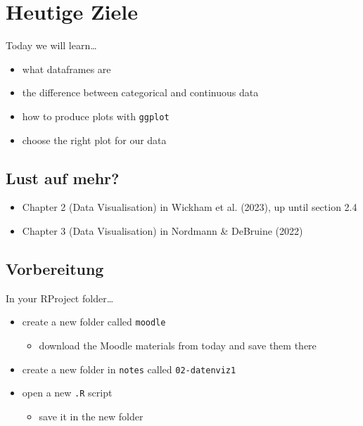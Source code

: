 \documentclass[
  letterpaper,
  DIV=11]{scrartcl}
\providecommand{\tightlist}{%
  \setlength{\itemsep}{0pt}\setlength{\parskip}{0pt}}\usepackage{longtable,booktabs,array}
\theoremstyle{definition}
\theoremstyle{remark}
\begin{document}
\hypertarget{heutige-ziele}{%
\section*{Heutige Ziele}\label{heutige-ziele}}

Today we will learn\ldots{}

\begin{itemize}
\tightlist
\item
  what dataframes are
\item
  the difference between categorical and continuous data
\item
  how to produce plots with \texttt{ggplot}
\item
  choose the right plot for our data
\end{itemize}

\hypertarget{lust-auf-mehr}{%
\subsection*{Lust auf mehr?}\label{lust-auf-mehr}}

\begin{itemize}
\tightlist
\item
  Chapter 2 (Data Visualisation) in Wickham et al. (2023), up until
  section 2.4
\item
  Chapter 3 (Data Visualisation) in Nordmann \& DeBruine (2022)
\end{itemize}

\hypertarget{vorbereitung}{%
\subsection*{Vorbereitung}\label{vorbereitung}}

In your RProject folder\ldots{}

\begin{itemize}
\tightlist
\item
  create a new folder called \texttt{moodle}

  \begin{itemize}
  \tightlist
  \item
    download the Moodle materials from today and save them there
  \end{itemize}
\item
  create a new folder in \texttt{notes} called \texttt{02-datenviz1}
\item
  open a new \texttt{.R} script

  \begin{itemize}
  \tightlist
  \item
    save it in the new folder
  \end{itemize}
\end{itemize}
\end{document}
